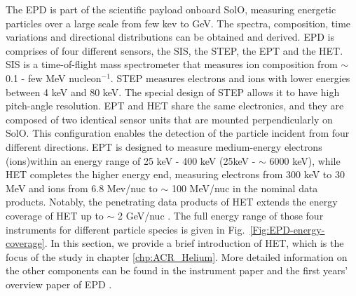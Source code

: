 The \ac{EPD} \citep{RodriguezPacheco-2019-EPD} is part of the scientific payload onboard \ac{SolO}, measuring energetic particles over a large scale from few kev to GeV. The spectra, composition, time variations and directional distributions can be obtained and derived.
\ac{EPD} is comprises of four different sensors, the \ac{SIS}, the \ac{STEP}, the \ac{EPT} and the \acl{HET}. 
\ac{SIS} is a time-of-flight mass spectrometer that measures ion composition from $\sim$ 0.1 - few MeV nucleon$^{-1}$. \ac{STEP} measures electrons and ions with lower energies between 4 keV and 80 keV. The special design of \ac{STEP} allows it to have high pitch-angle resolution.
\ac{EPT} and \ac{HET} share the same electronics, and they are composed of two identical sensor units that are mounted perpendicularly on \ac{SolO}. This configuration enables the detection of the particle incident from four different directions. \ac{EPT} is designed to measure medium-energy electrons (ions)within an energy range of 25 keV - 400 keV (25keV - $\sim$ 6000 keV), while \ac{HET} completes the higher energy end, measuring electrons from 300 keV to 30 MeV and ions from 6.8 Mev/nuc to $\sim$ 100 MeV/nuc in the nominal data products. Notably, the penetrating data products of \ac{HET} extends the energy coverage of \ac{HET} up to $\sim$ 2 GeV/nuc \citep{Elftmann-2020-PhD}.
The full energy range of those four instruments for different particle species is given in Fig.~\ref{Fig:EPD-energy-coverage}.
In this section, we provide a brief introduction of \ac{HET}, which is the focus of the study in chapter \ref{chp:ACR_Helium}. More detailed information on the other components can be found in the instrument paper \citep{RodriguezPacheco-2019-EPD} and the first years' overview paper of \ac{EPD} \citep{Wimmer2021AA}.


